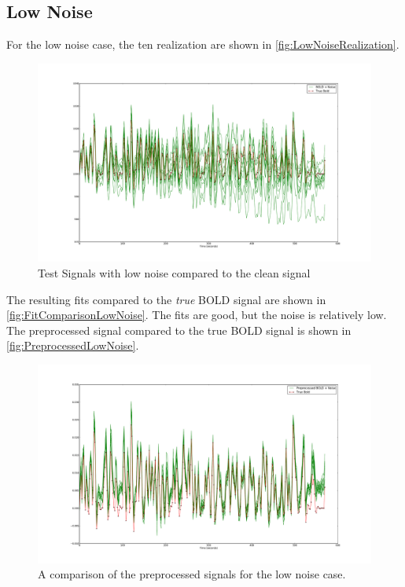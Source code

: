 \subsection{Low Noise}
For the low noise case, the ten realization are shown in \autoref{fig:LowNoiseRealization}.
\begin{figure}
\label{fig:LowNoiseRealization}
\includegraphics[trim=6cm 3cm 6cm 3cm,width=16cm]{images/realization_lownoise}
\caption{Test Signals with low noise compared to the clean signal}
\end{figure}

The resulting fits compared to the \emph{true} BOLD signal are shown in \autoref{fig:FitComparisonLowNoise}.
The fits are good, but the noise is relatively low. The preprocessed signal compared
to the true BOLD signal is shown in \autoref{fig:PreprocessedLowNoise}.

\begin{figure}
\label{fig:PreprocessedLowNoise}
\includegraphics[trim=6cm 3cm 6cm 3cm,width=16cm]{images/preprocessed_lownoise}
\caption{A comparison of the preprocessed signals for the low noise case.}
\end{figure}

